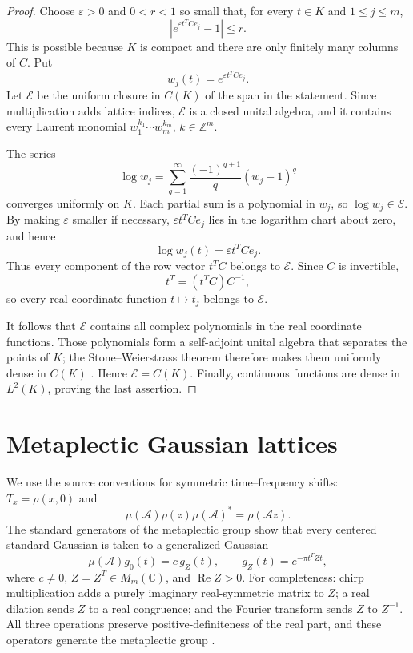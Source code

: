 \documentclass[11pt]{article}
\newcommand{\C}{\mathbb C}
\newcommand{\Z}{\mathbb Z}
\newcommand{\Rea}{\operatorname{Re}}
\begin{document}
\begin{proof}
Choose \(\varepsilon>0\) and \(0<r<1\) so small that, for every
\(t\in K\) and \(1\le j\le m\),
\[
 \left|e^{\varepsilon t^TCe_j}-1\right|\le r.
\]
This is possible because \(K\) is compact and there are only finitely many
columns of \(C\).  Put
\[
 w_j(t)=e^{\varepsilon t^TCe_j}.
\]
Let \(\mathcal E\) be the uniform closure in \(C(K)\) of the span in the
statement.  Since multiplication adds lattice indices, \(\mathcal E\) is a
closed unital algebra, and it contains every Laurent monomial
\(w_1^{k_1}\cdots w_m^{k_m}\), \(k\in\Z^m\).

The series
\[
 \log w_j=\sum_{q=1}^{\infty}\frac{(-1)^{q+1}}q(w_j-1)^q
\]
converges uniformly on \(K\).  Each partial sum is a polynomial in \(w_j\),
so \(\log w_j\in\mathcal E\).  By making \(\varepsilon\) smaller if
necessary, \(\varepsilon t^TCe_j\) lies in the logarithm chart about zero,
and hence
\[
 \log w_j(t)=\varepsilon t^TCe_j.
\]
Thus every component of the row vector \(t^TC\) belongs to
\(\mathcal E\).  Since \(C\) is invertible,
\[
 t^T=(t^TC)C^{-1},
\]
so every real coordinate function \(t\mapsto t_j\) belongs to
\(\mathcal E\).

It follows that \(\mathcal E\) contains all complex polynomials in the real
coordinate functions.  Those polynomials form a self-adjoint unital algebra
that separates the points of \(K\); the Stone--Weierstrass theorem therefore
makes them uniformly dense in \(C(K)\) \cite{Rudin}.  Hence
\(\mathcal E=C(K)\).  Finally, continuous functions are dense in
\(L^2(K)\), proving the last assertion.
\end{proof}

\section{Metaplectic Gaussian lattices}

We use the source conventions for symmetric time--frequency shifts:
\(T_x=\rho(x,0)\) and
\[
 \mu(\mathcal A)\rho(z)\mu(\mathcal A)^*=\rho(\mathcal A z).
\]
The standard generators of the metaplectic group show that every centered
standard Gaussian is taken to a generalized Gaussian
\[
 \mu(\mathcal A)g_0(t)=c\,g_Z(t),\qquad
 g_Z(t)=e^{-\pi t^TZt},
\]
where \(c\ne0\), \(Z=Z^T\in M_m(\C)\), and \(\Rea Z>0\).  For
completeness: chirp multiplication adds a purely imaginary real-symmetric
matrix to \(Z\); a real dilation sends \(Z\) to a real congruence; and the
Fourier transform sends \(Z\) to \(Z^{-1}\).  All three operations preserve
positive-definiteness of the real part, and these operators generate the
metaplectic group \cite{McNulty}.
\end{document}
